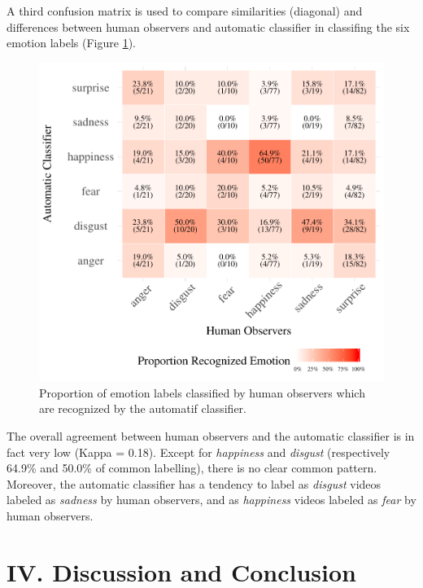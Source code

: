 \documentclass[conference,final,]{IEEEtran}
\makeatletter
\def\maxwidth{\ifdim\Gin@nat@width>\linewidth\linewidth
\else\Gin@nat@width\fi}
\let\Oldincludegraphics\includegraphics
\renewcommand{\includegraphics}[1]{\Oldincludegraphics[width=\maxwidth]{#1}}
\makeatother
\begin{document}
A third confusion matrix is used to compare similarities (diagonal) and
differences between human observers and automatic classifier in
classifing the six emotion labels (Figure
\nolinebreak \ref{fig:confusionMatrix_hr_ar}).

\begin{figure}
\centering
\includegraphics{ACII_2019_paper_files/figure-latex/confusionMatrix_hr_ar-1.pdf}
\caption{\label{fig:confusionMatrix_hr_ar}Proportion of emotion labels
classified by human observers which are recognized by the automatif
classifier.}
\end{figure}

The overall agreement between human observers and the automatic
classifier is in fact very low (Kappa = 0.18). Except for
\emph{happiness} and \emph{disgust} (respectively 64.9\% and 50.0\% of
common labelling), there is no clear common pattern. Moreover, the
automatic classifier has a tendency to label as \emph{disgust} videos
labeled as \emph{sadness} by human observers, and as \emph{happiness}
videos labeled as \emph{fear} by human observers.

\hypertarget{iv.-discussion-and-conclusion}{%
\section{IV. Discussion and
Conclusion}\label{iv.-discussion-and-conclusion}}
\end{document}

